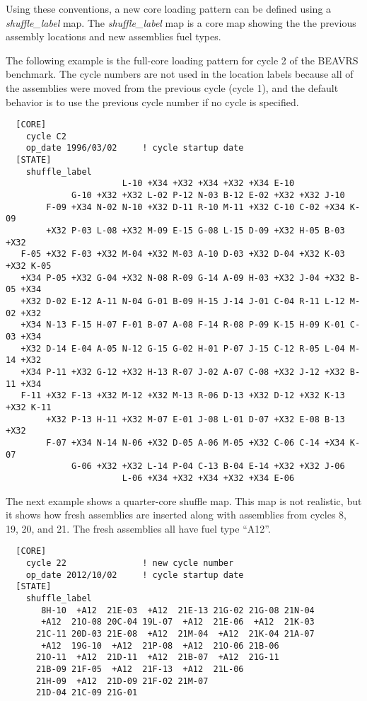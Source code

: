 Using these conventions, a new core loading pattern can be defined using a {\it shuffle\_label} map.
The {\it shuffle\_label} map is a core map showing the the previous assembly locations and
new assemblies fuel types.  

The following example is the full-core loading pattern for cycle 2 of the BEAVRS benchmark.
The cycle numbers are not used in the location labels because all of the assemblies
were moved from the previous cycle (cycle 1), and the default behavior is to use
the previous cycle number if no cycle is specified.
\begin{verbatim}
  [CORE]
    cycle C2
    op_date 1996/03/02     ! cycle startup date
  [STATE]
    shuffle_label
                       L-10 +X34 +X32 +X34 +X32 +X34 E-10
             G-10 +X32 +X32 L-02 P-12 N-03 B-12 E-02 +X32 +X32 J-10
        F-09 +X34 N-02 N-10 +X32 D-11 R-10 M-11 +X32 C-10 C-02 +X34 K-09
        +X32 P-03 L-08 +X32 M-09 E-15 G-08 L-15 D-09 +X32 H-05 B-03 +X32
   F-05 +X32 F-03 +X32 M-04 +X32 M-03 A-10 D-03 +X32 D-04 +X32 K-03 +X32 K-05
   +X34 P-05 +X32 G-04 +X32 N-08 R-09 G-14 A-09 H-03 +X32 J-04 +X32 B-05 +X34
   +X32 D-02 E-12 A-11 N-04 G-01 B-09 H-15 J-14 J-01 C-04 R-11 L-12 M-02 +X32
   +X34 N-13 F-15 H-07 F-01 B-07 A-08 F-14 R-08 P-09 K-15 H-09 K-01 C-03 +X34
   +X32 D-14 E-04 A-05 N-12 G-15 G-02 H-01 P-07 J-15 C-12 R-05 L-04 M-14 +X32
   +X34 P-11 +X32 G-12 +X32 H-13 R-07 J-02 A-07 C-08 +X32 J-12 +X32 B-11 +X34
   F-11 +X32 F-13 +X32 M-12 +X32 M-13 R-06 D-13 +X32 D-12 +X32 K-13 +X32 K-11
        +X32 P-13 H-11 +X32 M-07 E-01 J-08 L-01 D-07 +X32 E-08 B-13 +X32
        F-07 +X34 N-14 N-06 +X32 D-05 A-06 M-05 +X32 C-06 C-14 +X34 K-07
             G-06 +X32 +X32 L-14 P-04 C-13 B-04 E-14 +X32 +X32 J-06
                       L-06 +X34 +X32 +X34 +X32 +X34 E-06
\end{verbatim}

The next example shows a quarter-core shuffle map.  This map is not realistic,
but it shows how fresh assemblies are inserted along with assemblies from 
cycles 8, 19, 20, and 21.  The fresh assemblies all have fuel type ``A12''.
\begin{verbatim}
  [CORE]
    cycle 22               ! new cycle number
    op_date 2012/10/02     ! cycle startup date
  [STATE]
    shuffle_label
       8H-10  +A12  21E-03  +A12  21E-13 21G-02 21G-08 21N-04
       +A12  21O-08 20C-04 19L-07  +A12  21E-06  +A12  21K-03
      21C-11 20D-03 21E-08  +A12  21M-04  +A12  21K-04 21A-07
       +A12  19G-10  +A12  21P-08  +A12  21O-06 21B-06
      21O-11  +A12  21D-11  +A12  21B-07  +A12  21G-11
      21B-09 21F-05  +A12  21F-13  +A12  21L-06
      21H-09  +A12  21D-09 21F-02 21M-07
      21D-04 21C-09 21G-01
\end{verbatim}

